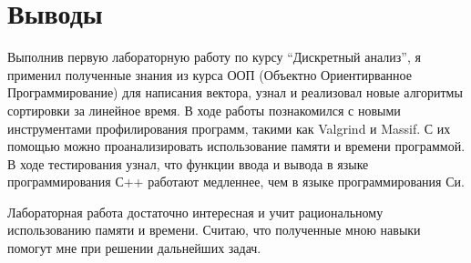 \section{Выводы}

Выполнив первую лабораторную работу по курсу \enquote{Дискретный анализ},
я применил полученные знания из курса ООП (Объектно Ориентирванное Программирование) для написания вектора,
узнал и реализовал новые алгоритмы сортировки за линейное время. В ходе работы познакомился с новыми инструментами 
профилирования программ, такими как Valgrind и Massif. С их помощью можно проанализировать использование 
памяти и времени программой. В ходе тестирования узнал, что функции ввода и вывода в языке программирования С++
работают медленнее, чем в языке программирования Си.

Лабораторная работа достаточно интересная и учит рациональному использованию памяти и времени. Считаю, что полученные мною навыки 
помогут мне при решении дальнейших задач.
\pagebreak